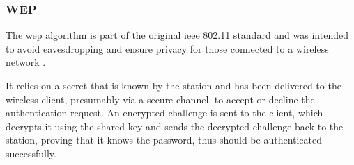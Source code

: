 \subsubsection{WEP}

The \gls{wep} algorithm is part of the original \gls{ieee} 802.11 standard and was intended to avoid eavesdropping and ensure privacy for those connected to a wireless network \cite{ieee_80211_2020}.

It relies on a secret that is known by the station and has been delivered to the wireless client, presumably via a secure channel, to accept or decline the authentication request. An encrypted challenge is sent to the client, which decrypts it using the shared key and sends the decrypted challenge back to the station, proving that it knows the password, thus should be authenticated successfully.



